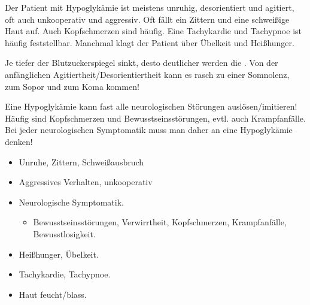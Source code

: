 {
Der Patient mit Hypoglykämie ist meistens unruhig, desorientiert und agitiert,
oft auch unkooperativ und aggressiv. Oft fällt ein Zittern und eine schweißige
Haut auf. Auch Kopfschmerzen sind häufig. Eine Tachykardie und Tachypnoe ist
häufig feststellbar. Manchmal klagt der Patient über Übelkeit und Heißhunger.

Je tiefer der Blutzuckerspiegel sinkt, desto deutlicher werden die
. Von der anfänglichen
Agitiertheit/Desorientiertheit kann es rasch zu einer Somnolenz, zum Sopor und
zum Koma kommen!

Eine Hypoglykämie kann fast alle neurologischen  Störungen
aus\-lösen/imitieren! Häufig sind Kopfschmerzen und Bewusstseinsstörungen, evtl.
auch Krampfanfälle. Bei jeder neurologischen Symptomatik muss man daher an eine Hypoglykämie denken!



}{
\begin{itemize}
  \item Unruhe, Zittern, Schweißausbruch
  \item Aggressives Verhalten, unkooperativ
  \item Neurologische Symptomatik.
  \begin{itemize}
    \item Bewusstseinsstörungen, Verwirrtheit, Kopfschmerzen, Krampfanfälle,
    Bewusstlosigkeit.
  \end{itemize}
  \item Heißhunger, Übelkeit.
  \item Tachykardie, Tachypnoe.
  \item Haut feucht/blass.
\end{itemize}
}{}{}{}













